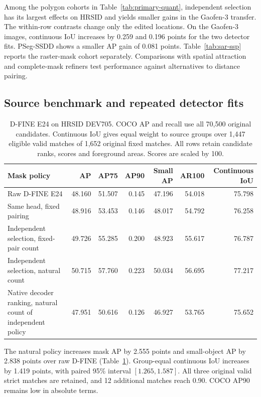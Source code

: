\documentclass[journal]{IEEEtran}
\begin{document}
Among the polygon cohorts in Table~\ref{tab:primary-quant}, independent selection has its largest effects on HRSID and yields smaller gains in the Gaofen-3 transfer. The within-row contrasts change only the edited locations. On the Gaofen-3 images, continuous IoU increases by 0.259 and 0.196 points for the two detector fits. PSeg-SSDD shows a smaller AP gain of 0.081 points. Table~\ref{tab:sar-ssp} reports the raster-mask cohort separately. Comparisons with spatial attraction and complete-mask refiners test performance against alternatives to distance pairing.

\subsection{Source benchmark and repeated detector fits}
\begin{table}[t]
\centering
\caption{D-FINE E24 on HRSID DEV705. COCO AP and recall use all 70,500 original candidates. Continuous IoU gives equal weight to source groups over 1,447 eligible valid matches of 1,652 original fixed matches. All rows retain candidate ranks, scores and foreground areas. Scores are scaled by 100.}
\label{tab:dev}
\begin{tabular}{lrrrrrr}
\toprule
Mask policy & AP & AP75 & AP90 & Small AP & AR100 & Continuous IoU\\
\midrule
Raw D-FINE E24 & 48.160 & 51.507 & 0.145 & 47.196 & 54.018 & 75.798\\
Same head, fixed pairing & 48.916 & 53.453 & 0.146 & 48.017 & 54.792 & 76.258\\
Independent selection, fixed-pair count & 49.726 & 55.285 & 0.200 & 48.923 & 55.617 & 76.787\\
\midrule
Independent selection, natural count & 50.715 & 57.760 & 0.223 & 50.034 & 56.695 & 77.217\\
Native decoder ranking, natural count of independent policy & 47.951 & 50.616 & 0.126 & 46.927 & 53.765 & 75.652\\
\bottomrule
\end{tabular}
\end{table}

The natural policy increases mask AP by 2.555 points and small-object AP by 2.838 points over raw D-FINE (Table~\ref{tab:dev}). Group-equal continuous IoU increases by 1.419 points, with paired 95\% interval \([1.265,1.587]\). All three original valid strict matches are retained, and 12 additional matches reach 0.90. COCO AP90 remains low in absolute terms.
\end{document}
